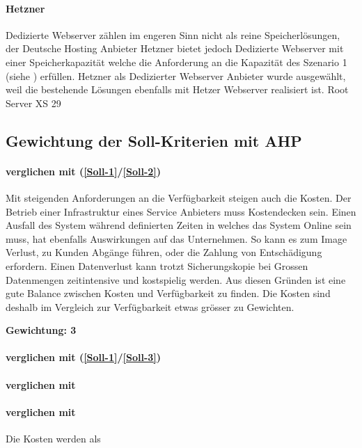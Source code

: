 \paragraph{Hetzner}\label{Al-3}
Dedizierte Webserver zählen im engeren Sinn nicht als reine Speicherlösungen, der Deutsche Hosting Anbieter Hetzner bietet jedoch Dedizierte Webserver mit einer Speicherkapazität welche die Anforderung an die Kapazität des Szenario 1 (siehe ) erfüllen. Hetzner als Dedizierter Webserver Anbieter wurde ausgewählt, weil die bestehende Lösungen ebenfalls mit Hetzer Webserver realisiert ist. Root Server XS 29


\subsection{Gewichtung der Soll-Kriterien mit AHP}

\paragraph*{ verglichen mit  (\ref{Soll-1}/\ref{Soll-2})} 
Mit steigenden Anforderungen an die Verfügbarkeit steigen auch die Kosten. Der Betrieb einer Infrastruktur eines Service Anbieters muss Kostendecken sein. Einen Ausfall des System während definierten Zeiten in welches das System Online sein muss, hat ebenfalls Auswirkungen auf das Unternehmen. So kann es zum Image Verlust, zu Kunden Abgänge führen, oder die Zahlung von Entschädigung erfordern. Einen Datenverlust kann trotzt Sicherungskopie bei Grossen Datenmengen zeitintensive und kostspielig werden. Aus diesen Gründen ist eine gute Balance zwischen Kosten und Verfügbarkeit zu finden. Die Kosten sind deshalb im Vergleich zur Verfügbarkeit etwas grösser zu Gewichten.

\textbf{Gewichtung: 3}

\paragraph*{ verglichen mit  (\ref{Soll-1}/\ref{Soll-3})}

\paragraph*{ verglichen mit }

\paragraph*{ verglichen mit }
Die Kosten werden als 
